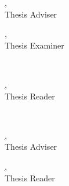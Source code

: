 \documentclass[a4paper, 12pt]{report}
\begin{document}
    \else
    \noindent \begin{minipage}{.5\textwidth}
    	\centering
    	\underline{\MakeUppercase{\adviserone}, \adviseronedegree}\\
    	Thesis Adviser
    \end{minipage}%
    \begin{minipage}{.5\textwidth}
    	\centering
    	\underline{\MakeUppercase{\examiner}, \examinerdegree}\\
    	Thesis Examiner
    \end{minipage}\\

    \vspace{1cm}

    \noindent\begin{minipage}{\textwidth}
            \centering
            \underline{\MakeUppercase{\reader}, \readerdegree}\\
            Thesis Reader
    \end{minipage}\\\fi

    \else

    \noindent \begin{minipage}{.5\textwidth}
    	\centering
    	\underline{\MakeUppercase{\adviserone}, \adviseronedegree}\\
    	Thesis Adviser
    \end{minipage}%
    \begin{minipage}{0.5\textwidth}
            \centering
            \underline{\MakeUppercase{\reader}, \readerdegree}\\
            Thesis Reader
    \end{minipage}\\ 
    \fi
\fi


    
\end{document}
